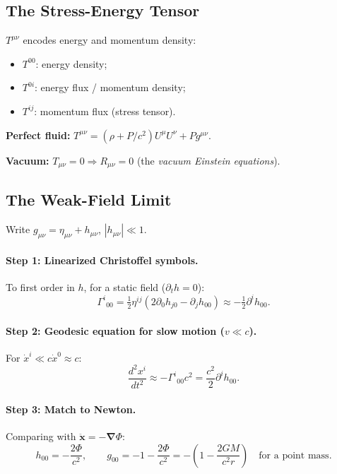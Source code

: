 \documentclass[12pt,a4paper]{article}
\theoremstyle{plain}
\theoremstyle{definition}
\theoremstyle{remark}
\newcommand{\ve}[1]{\mathbf{#1}}           %
\newcommand{\nab}{\boldsymbol{\nabla}}
\begin{document}
\subsection{The Stress-Energy Tensor}

$T^{\mu\nu}$ encodes energy and momentum density:
\begin{itemize}
  \item $T^{00}$: energy density;
  \item $T^{0i}$: energy flux / momentum density;
  \item $T^{ij}$: momentum flux (stress tensor).
\end{itemize}
\textbf{Perfect fluid:} $T^{\mu\nu} = (\rho+P/c^2)U^\mu U^\nu + Pg^{\mu\nu}$.

\textbf{Vacuum:} $T_{\mu\nu}=0 \Rightarrow R_{\mu\nu}=0$ (the \textit{vacuum Einstein equations}).

\subsection{The Weak-Field Limit}\label{sec:weakfield}

Write $g_{\mu\nu}=\eta_{\mu\nu}+h_{\mu\nu}$, $|h_{\mu\nu}|\ll1$.

\paragraph{Step 1: Linearized Christoffel symbols.}
To first order in $h$, for a static field ($\partial_t h=0$):
\[
  \Gamma^i{}_{00}
  = \tfrac{1}{2}\eta^{ij}(2\partial_0 h_{j0}-\partial_j h_{00})
  \approx -\tfrac{1}{2}\partial^i h_{00}.
\]

\paragraph{Step 2: Geodesic equation for slow motion ($v\ll c$).}
For $\dot{x}^i\ll c\dot{x}^0\approx c$:
\[
  \frac{d^2x^i}{dt^2} \approx -\Gamma^i{}_{00}c^2 = \frac{c^2}{2}\partial^i h_{00}.
\]

\paragraph{Step 3: Match to Newton.}
Comparing with $\ddot{\ve{x}} = -\nab\Phi$:
\[
  h_{00} = -\frac{2\Phi}{c^2},
  \qquad
  g_{00} = -1-\frac{2\Phi}{c^2} = -\!\left(1-\frac{2GM}{c^2r}\right)\quad\text{for a point mass.}
\]
\end{document}
